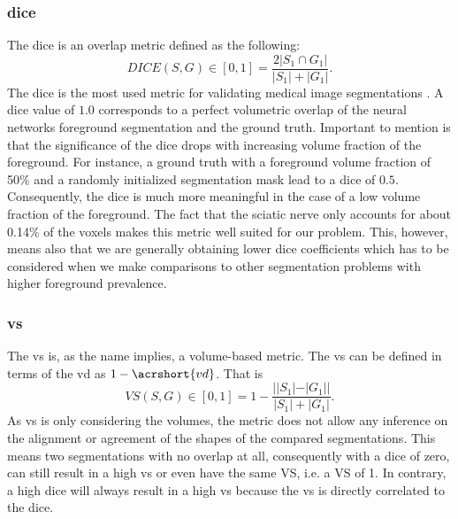 \subsubsection{\acrlong{dice}}
The \gls{dice} \cite{Dice1945MeasuresTh} is an overlap metric defined as the following:
\begin{equation}
   DICE(S, G) \in [0, 1] = \frac{2|S_{1} \cap G_{1}|}{|S_{1}| + |G_{1}|}.
   \label{eq:dice}
\end{equation}
The \gls{dice} is the most used metric for validating medical image segmentations \cite{Taha2015MetricsTool}. A \gls{dice} value of $1.0$ corresponds to a perfect volumetric overlap of the neural networks foreground segmentation and the ground truth. Important to mention is that the significance of the \gls{dice} drops with increasing volume fraction of the foreground. For instance, a ground truth with a foreground volume fraction of 50\% and a randomly initialized segmentation mask lead to a \gls{dice} of $0.5$. Consequently, the \gls{dice} is much more meaningful in the case of a low volume fraction of the foreground. The fact that the sciatic nerve only accounts for about 0.14\% of the voxels makes this metric well suited for our problem. This, however, means also that we are generally obtaining lower \gls{dice} coefficients which has to be considered when we make comparisons to other segmentation problems with higher foreground prevalence.

\subsubsection{\acrlong{vs}}
The \gls{vs} \cite{Taha2015MetricsTool} is, as the name implies, a volume-based metric. The \gls{vs} can be defined in terms of the \gls{vd} as $1 - \acrshort{vd}$. That is
\begin{equation}
   VS(S, G) \in [0, 1] = 1 - \frac{||S_{1}| - |G_{1}||}{|S_{1}| + |G_{1}|}.
   \label{eq:vs}
\end{equation}
As \gls{vs} is only considering the volumes, the metric does not allow any inference on the alignment or agreement of the shapes of the compared segmentations. This means two segmentations with no overlap at all, consequently with a \gls{dice} of zero, can still result in a high \gls{vs} or even have the same VS, i.e. a VS of 1. In contrary, a high \gls{dice} will always result in a high \gls{vs} because the \gls{vs} is directly correlated to the \gls{dice}.


